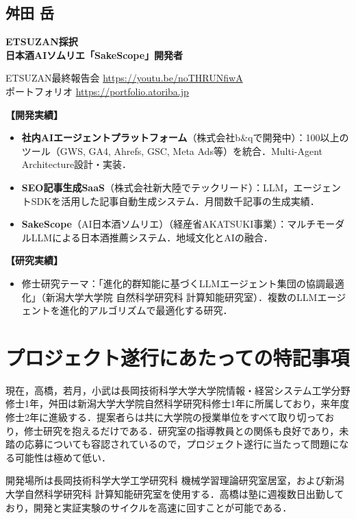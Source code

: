 \documentclass[paper=a4,fontsize=10.5bp,jafontsize=10.5bp,twocolumn]{jlreq}
\begin{document}
\subsection*{舛田 岳}

\noindent\textbf{ETSUZAN採択}\\
\textbf{日本酒AIソムリエ「SakeScope」開発者}

{\small\sffamily
\noindent
ETSUZAN最終報告会 \url{https://youtu.be/noTHRUNfiwA}\\
ポートフォリオ \url{https://portfolio.atoriba.jp}
}

\textbf{【開発実績】}
\begin{itemize}
  \item \textbf{社内AIエージェントプラットフォーム}（株式会社b\&qで開発中）：100以上のツール（GWS, GA4, Ahrefs, GSC, Meta Ads等）を統合．Multi-Agent Architecture設計・実装．
  \item \textbf{SEO記事生成SaaS}（株式会社新大陸でテックリード）：LLM，エージェントSDKを活用した記事自動生成システム．月間数千記事の生成実績．
  \item \textbf{SakeScope}（AI日本酒ソムリエ）（経産省AKATSUKI事業）：マルチモーダルLLMによる日本酒推薦システム．地域文化とAIの融合．
\end{itemize}

\textbf{【研究実績】}
\begin{itemize}
  \item 修士研究テーマ：「進化的群知能に基づくLLMエージェント集団の協調最適化」（新潟大学大学院 自然科学研究科 計算知能研究室）．複数のLLMエージェントを進化的アルゴリズムで最適化する研究．
\end{itemize}

\section{プロジェクト遂行にあたっての特記事項}

現在，高橋，若月，小武は長岡技術科学大学大学院情報・経営システム工学分野修士1年，舛田は新潟大学大学院自然科学研究科修士1年に所属しており，来年度修士2年に進級する．提案者らは共に大学院の授業単位をすべて取り切っており，修士研究を抱えるだけである．研究室の指導教員との関係も良好であり，未踏の応募についても容認されているので，プロジェクト遂行に当たって問題になる可能性は極めて低い．

開発場所は長岡技術科学大学工学研究科 機械学習理論研究室居室，および新潟大学自然科学研究科 計算知能研究室を使用する．高橋は塾に週複数日出勤しており，開発と実証実験のサイクルを高速に回すことが可能である．
\end{document}
